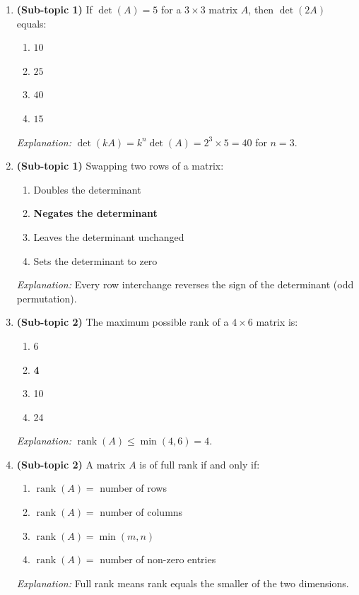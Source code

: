 \documentclass[12pt,a4paper]{article}
\begin{document}
\begin{enumerate}[label=\textbf{MCQ\arabic*.}]

  \item \textbf{(Sub-topic 1)} If $\det(A) = 5$ for a $3\times3$ matrix $A$, then $\det(2A)$ equals:
    \begin{enumerate}[label=(\alph*)]
      \item $10$
      \item $25$
      \item \textbf{$40$}
      \item $15$
    \end{enumerate}
    \emph{Explanation:} $\det(kA) = k^n\det(A) = 2^3 \times 5 = 40$ for $n=3$.

  \item \textbf{(Sub-topic 1)} Swapping two rows of a matrix:
    \begin{enumerate}[label=(\alph*)]
      \item Doubles the determinant
      \item \textbf{Negates the determinant}
      \item Leaves the determinant unchanged
      \item Sets the determinant to zero
    \end{enumerate}
    \emph{Explanation:} Every row interchange reverses the sign of the determinant (odd permutation).

  \item \textbf{(Sub-topic 2)} The maximum possible rank of a $4\times6$ matrix is:
    \begin{enumerate}[label=(\alph*)]
      \item 6
      \item \textbf{4}
      \item 10
      \item 24
    \end{enumerate}
    \emph{Explanation:} $\operatorname{rank}(A) \leq \min(4,6) = 4$.

  \item \textbf{(Sub-topic 2)} A matrix $A$ is of full rank if and only if:
    \begin{enumerate}[label=(\alph*)]
      \item $\operatorname{rank}(A) = $ number of rows
      \item $\operatorname{rank}(A) = $ number of columns
      \item \textbf{$\operatorname{rank}(A) = \min(m,n)$}
      \item $\operatorname{rank}(A) = $ number of non-zero entries
    \end{enumerate}
    \emph{Explanation:} Full rank means rank equals the smaller of the two dimensions.


\end{enumerate}
\end{document}
